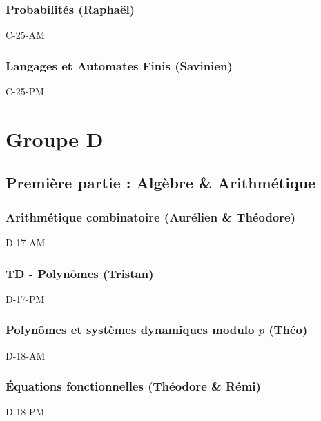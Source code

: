 \documentclass[poly,trombi]{valbonne}
\begin{document}
\subsection{Probabilités (Raphaël)}

{C-25-AM}

\subsection{Langages et Automates Finis (Savinien)}

{C-25-PM}






\chapter{Groupe D}

\minitoc \clearpage

\section{Première partie : Algèbre \& Arithmétique}

\subsection{Arithmétique combinatoire (Aurélien \& Théodore)}

{D-17-AM}

\subsection{TD - Polynômes (Tristan)}

{D-17-PM}

\subsection{Polynômes et systèmes dynamiques modulo $p$ (Théo)}

{D-18-AM}

\subsection{Équations fonctionnelles (Théodore \& Rémi)}

{D-18-PM}
\end{document}

